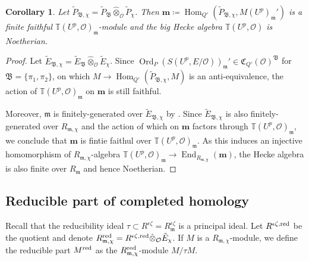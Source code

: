 \documentclass[leqno]{amsart}
\newcommand{\TT}{\mathbb{T}} %
\newcommand{\B}{\mathfrak B}
\newcommand{\fC}{\mathfrak C}
\DeclareMathOperator{\Ord}{Ord}
\newcommand{\red}{\textnormal{red}}
\newcommand{\oo}{\mathcal{O}} %
\newcommand{\fm}{\mathfrak{m}}
\DeclareMathOperator{\End}{End}
\DeclareMathOperator{\Hom}{Hom}
\newtheorem{cor}[thm]{Corollary}
\theoremstyle{definition}
\theoremstyle{remark}
\begin{document}
\begin{cor}\label{cor:Hecke_Noetherian}
	Let $\tilde{P}_{\B,\chi}
	=\tilde{P}_\B\hat{\otimes}_{\oo}\tilde{P}_\chi$.
	Then $\mathbf{m}\coloneqq
	\Hom_{Q'}(\tilde{P}_{\B,\chi},M(U^p)_{\fm}')$
	is a finite faithful $\TT(U^p,\oo)_{\fm}$-module
	and the big Hecke algebra
	$\TT(U^p,\oo)$ is Noetherian.
\end{cor}
\begin{proof}
	Let $\tilde{E}_{\B,\chi}
	=\tilde{E}_\B\hat{\otimes}_{\oo}\tilde{E}_\chi$.
	Since $\Ord_P(S(U^p,E/\oo))_\fm'
	\in \fC_{Q'}(\oo)^{\B}$
	for $\B=\{\pi_1,\pi_2\}$,
	on which $M\to \Hom_{Q'}(\tilde{P}_{\B,\chi},M)$
	is an anti-equivalence,
	the action of $\TT(U^p,\oo)_\fm$
	on $\mathbf{m}$ is still faithful.

	Moreover, $\fm$ is finitely-generated
	over  $ \tilde{E}_{\B,\chi}$
	by \cite[Prop 4.17]{pask}.
	Since $ \tilde{E}_{\B,\chi}$
	is also finitely-generated
	over $R_{\fm,\chi}$
	and the action of which on $\mathbf{m}$
	factors through $\TT(U^p,\oo)_{\fm}$,
	we conclude that $\mathbf{m}$ 
	is fintie faithul over $\TT(U^p,\oo)_{\fm}$.
	As this induces an injective homomorphism
	of $R_{\fm,\chi}$-algebra
	$\TT(U^p,\oo)_{\fm}\to 
	\End_{R_{\fm,\chi}}(\mathbf{m})$,
	the Hecke algebra
	is also finite over $R_{\fm}$ and hence Noetherian.
\end{proof}


\subsection{Reducible part of completed homology}

Recall that the reducibility ideal 
$\tau\subset R^{\epsilon\zeta}=R^{\epsilon\zeta}_{\fm}$
is a principal ideal.
Let $R^{\epsilon\zeta,\red}$ be the quotient 
and denote $R_{\fm,\chi}^{\red}=R^{\epsilon\zeta,\red}
\hat{\otimes}_{\oo}\tilde{E}_\chi$.
If $M$ is a  $R_{\fm,\chi}$-module,
we define the reducible part $M^{\red}$ 
as the $R_{\fm,\chi}^{\red}$-module
$M/\tau M$.
\end{document}
